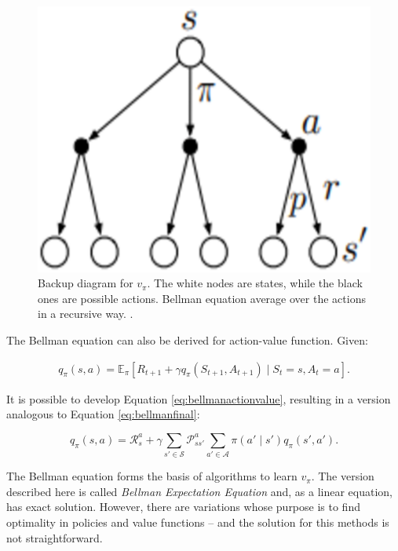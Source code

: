 \begin{figure}[!htpb]
	\centering
	\includegraphics[scale=0.3]{Cap4/bellmaneqtree.eps}
	\caption{Backup diagram for $v_{\pi}$. The white nodes are states, while the black ones are possible actions. Bellman equation average over the actions in a recursive way. \cite{sutton1998rli}.}
	\label{fig:bellmaneqtree}
\end{figure}

The Bellman equation can also be derived for action-value function. Given:

\begin{align}\label{eq:bellmanactionvalue}
q_{\pi}(s,a) = \mathbb{E}_{\pi}[R_{t+1} + \gamma q_{\pi}(S_{t+1}, A_{t+1}) \mid S_{t} = s, A_{t} = a].
\end{align}

It is possible to develop Equation \ref{eq:bellmanactionvalue}, resulting in a version analogous to Equation \eqref{eq:bellmanfinal}:

\begin{equation}
q_{\pi}(s,a) = \mathcal{R}_{s}^{a} + \gamma \sum_{s' \in \mathcal{S}} \mathcal{P}_{ss'}^{a}\sum_{a' \in \mathcal{A}} \pi(a' \mid s')q_{\pi}(s', a').
\end{equation}

The Bellman equation forms the basis of algorithms to learn $v_{\pi}$. The version described here is called \textit{Bellman Expectation Equation} and, as a linear equation, has exact solution. However, there are variations whose purpose is to find optimality in policies and value functions -- and the solution for this methods is not straightforward.

